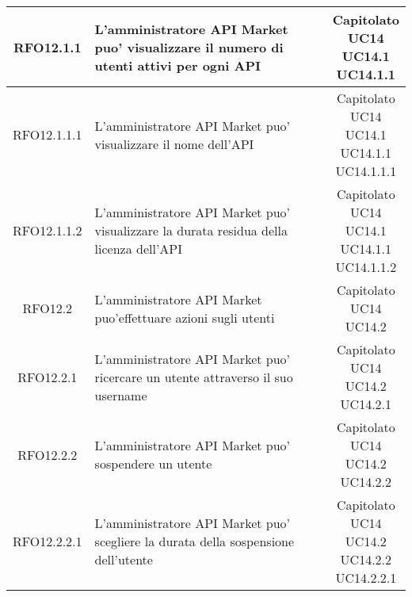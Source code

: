 \begin{longtable}{|c|p{8cm}|c|}
\hypertarget{RFO12.1.1}{RFO12.1.1} &  L'amministratore API Market puo' visualizzare il numero di utenti attivi per ogni API & \makecell*{Capitolato\\UC14\\UC14.1\\UC14.1.1} \\
\hline

\hypertarget{RFO12.1.1.1}{RFO12.1.1.1} &  L'amministratore API Market puo' visualizzare il nome dell'API & \makecell*{Capitolato\\UC14\\UC14.1\\UC14.1.1\\UC14.1.1.1} \\
\hline

\hypertarget{RFO12.1.1.2}{RFO12.1.1.2} &  L'amministratore API Market puo' visualizzare la durata residua della licenza dell'API & \makecell*{Capitolato\\UC14\\UC14.1\\UC14.1.1\\UC14.1.1.2} \\
\hline

\hypertarget{RFO12.2}{RFO12.2} &  L'amministratore API Market puo'effettuare azioni sugli utenti& \makecell*{Capitolato\\UC14\\UC14.2} \\
\hline

\hypertarget{RFO12.2.1}{RFO12.2.1} &  L'amministratore API Market puo' ricercare un utente attraverso il suo username& \makecell*{Capitolato\\UC14\\UC14.2\\UC14.2.1} \\
\hline

\hypertarget{RFO12.2.2}{RFO12.2.2} &  L'amministratore API Market puo' sospendere un utente& \makecell*{Capitolato\\UC14\\UC14.2\\UC14.2.2} \\
\hline

\hypertarget{RFO12.2.2.1}{RFO12.2.2.1} &  L'amministratore API Market puo' scegliere la durata della sospensione dell'utente& \makecell*{Capitolato\\UC14\\UC14.2\\UC14.2.2\\UC14.2.2.1} \\
\hline


\end{longtable}
